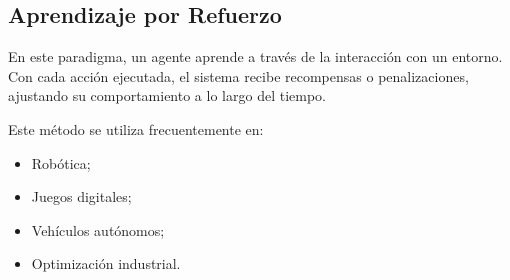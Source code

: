 \subsection{Aprendizaje por Refuerzo}

En este paradigma, un agente aprende a través de la interacción con un entorno. Con cada acción
ejecutada, el sistema recibe recompensas o penalizaciones, ajustando su comportamiento a lo
largo del tiempo.

Este método se utiliza frecuentemente en:

\begin{itemize}
    \item Robótica;
    \item Juegos digitales;
    \item Vehículos autónomos;
    \item Optimización industrial.
\end{itemize} 